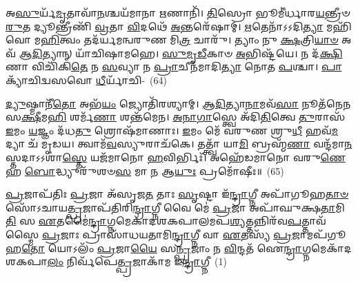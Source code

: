 𑌅\-\ul{𑌸𑍁}\-𑌰𑍍𑌯᳴\-\ul{𑌮𑍃}\-𑌤𑌾𑌵𑌾᳴\-\ul{𑌨}\-𑌶𑍍𑌚𑌯᳴𑌮𑌾𑌨𑌾 \ul{𑌋}\-𑌣𑌾𑌨𑌿᳴। \ul{𑌤𑌿}\-𑌸𑍍𑌰𑍋 𑌭𑍂𑌮𑍀॑𑌰𑍍𑌧𑌾𑌰\-\ul{𑌯}\-𑌨𑍍𑌤𑍍𑌰𑍀𑍞 \ul{𑌰𑍁}\-𑌤 𑌦𑍍𑌯𑍂𑌨𑍍𑌤𑍍𑌰𑍀𑌣𑌿᳴ \ul{𑌵𑍍𑌰}\-𑌤𑌾 \ul{𑌵𑌿}\-𑌦𑌥𑍇᳴ \ul{𑌅}\-𑌨𑍍𑌤𑌰𑍇᳴𑌷𑌾𑌮𑍍। \ul{𑌋}\-𑌤𑍇𑌨𑌾᳴𑌽𑌽𑌦𑌿\-\ul{𑌤𑍍𑌯𑌾} 𑌮𑌹𑌿᳴ 𑌵𑍋 𑌮\-\ul{𑌹𑌿}\-𑌤𑍍𑌵𑌂 𑌤𑌦᳴𑌰𑍍𑌯𑌮𑌨𑍍𑌵𑌰𑍁𑌣 𑌮𑌿\-\ul{𑌤𑍍𑌰} 𑌚𑌾𑌰𑍁᳴। 𑌤𑍍𑌯𑌾𑌂 𑌨𑍁 \ul{𑌕𑍍𑌷}\-𑌤𑍍𑌰𑌿\-\ul{𑌯𑌾}\-\-\ul{𑍞} 𑌅𑌵᳴ 𑌆\-\ul{𑌦𑌿}\-𑌤𑍍𑌯𑌾𑌨𑍍 𑌯𑌾᳴𑌚𑌿𑌷𑌾𑌮𑌹𑍇। \ul{𑌸𑍁}\-\-\ul{𑌮𑍃}\-\-\ul{𑌡𑍀}\-𑌕𑌾𑍞 \ul{𑌅}\-𑌭𑌿𑌷𑍍𑌟᳴𑌯𑍇। 𑌨 𑌦᳴\-\ul{𑌕𑍍𑌷𑌿}\-𑌣𑌾 𑌵𑌿𑌚𑌿᳴𑌕𑌿\-\ul{𑌤𑍇} 𑌨 \ul{𑌸}\-𑌵𑍍𑌯𑌾 𑌨 \ul{𑌪𑍍𑌰𑌾}\-𑌚𑍀𑌨᳴𑌮𑌾𑌦𑌿\-\ul{𑌤𑍍𑌯𑌾} 𑌨𑍋𑌤 \ul{𑌪}\-𑌶𑍍𑌚𑌾। \ul{𑌪𑌾}\-𑌕𑍍𑌯𑌾᳴𑌚𑌿𑌦𑍍𑌵𑌸𑌵𑍋 \ul{𑌧𑍀}\-𑌰𑍍𑌯𑌾᳴𑌚𑌿-~(64)

\-\ul{𑌦𑍍𑌯𑍁}\-𑌷𑍍𑌮𑌾𑌨𑍀᳴\-\ul{𑌤𑍋} 𑌅𑌭᳴\-\ul{𑌯𑌂} 𑌜𑍍𑌯𑍋𑌤𑌿᳴𑌰𑌶𑍍𑌯𑌾𑌮𑍍। \ul{𑌆}\-\-\ul{𑌦𑌿}\-𑌤𑍍𑌯𑌾\-\ul{𑌨𑌾}\-𑌮𑌵᳴\-\ul{𑌸𑌾} 𑌨𑍂𑌤᳴𑌨𑍇𑌨 𑌸\-\ul{𑌕𑍍𑌷𑍀}\-𑌮\-\ul{𑌹𑌿} 𑌶𑌰𑍍𑌮᳴\-\ul{𑌣𑌾} 𑌶𑌨𑍍𑌤᳴𑌮𑍇𑌨। \ul{𑌅}\-\-\ul{𑌨𑌾}\-\-\ul{𑌗𑌾}\-𑌸𑍍𑌤𑍍𑌵𑍇 𑌅᳴𑌦𑌿\-\ul{𑌤𑌿}\-𑌤𑍍𑌵𑍇 \ul{𑌤𑍁}\-𑌰𑌾𑌸᳴ \ul{𑌇}\-𑌮𑌂 \ul{𑌯}\-𑌜𑍍𑌞𑌂 𑌦᳴𑌧\-\ul{𑌤𑍁} 𑌶𑍍𑌰𑍋𑌷᳴𑌮𑌾𑌣𑌾𑌃। \ul{𑌇}\-𑌮𑌂 𑌮𑍇᳴ 𑌵𑌰𑍁𑌣 𑌶𑍍𑌰𑍁\-\ul{𑌧𑍀} 𑌹𑌵᳴\-\ul{𑌮}\-𑌦𑍍𑌯𑌾 𑌚᳴ 𑌮𑍃𑌡𑌯। 𑌤𑍍𑌵𑌾𑌮᳴\-\ul{𑌵}\-𑌸𑍍𑌯𑍁𑌰𑌾𑌚᳴𑌕𑍇। 𑌤𑌤𑍍𑌤𑍍𑌵𑌾᳴ 𑌯𑌾\-\ul{𑌮𑌿} 𑌬𑍍𑌰𑌹𑍍𑌮᳴\-\ul{𑌣𑌾} 𑌵𑌨𑍍𑌦᳴𑌮𑌾\-\ul{𑌨}\-𑌸𑍍𑌤𑌦𑌾𑌽𑌽𑌶𑌾॑\-\ul{𑌸𑍍𑌤𑍇} 𑌯𑌜᳴𑌮𑌾𑌨𑍋 \ul{𑌹}\-𑌵𑌿𑌰𑍍𑌭𑌿𑌃᳴। 𑌅𑌹𑍇᳴𑌡𑌮𑌾𑌨𑍋 𑌵𑌰𑍁\-\ul{𑌣𑍇}\-𑌹 \ul{𑌬𑍋}\-𑌦𑍍𑌧𑍍𑌯𑍁𑌰𑍁᳴𑌶𑍞\-\ul{𑌸} 𑌮𑌾 \ul{𑌨} 𑌆\-\ul{𑌯𑍁𑌃} 𑌪𑍍𑌰𑌮𑍋᳴𑌷𑍀𑌃॥~(65)


{\anuvakamend[{𑌨𑌾\-\ul{𑌮𑌾}\-𑌗𑍍𑌨𑌿𑌃 𑌸𑍞 𑌶𑌵᳴\-\ul{𑌸𑍋} 𑌰𑌕𑍍𑌷᳴𑌮𑌾𑌣𑌾 \ul{𑌧𑍀}\-𑌰𑍍𑌯𑌾᳴\-\ul{𑌚𑌿}\-𑌦𑍇\-\ul{𑌕𑌾}\-𑌨𑍍𑌨𑌪᳴\-\ul{𑌞𑍍𑌚𑌾}\-𑌶𑌚𑍍𑌚᳴}]}%

{}


\setcounter{anuvakam}{0}
\-\ul{𑌪𑍍𑌰}\-𑌜𑌾𑌪᳴𑌤𑌿𑌃 \ul{𑌪𑍍𑌰}\-𑌜𑌾 𑌅᳴𑌸𑍃𑌜\-\ul{𑌤} 𑌤𑌾𑌃 \ul{𑌸𑍃}\-𑌷𑍍𑌟𑌾 𑌇᳴\-\ul{𑌨𑍍𑌦𑍍𑌰𑌾}\-𑌗𑍍𑌨𑍀 𑌅𑌪𑌾᳴𑌗𑍂𑌹\-\ul{𑌤𑌾}\-\-\ul{𑍞} 𑌸𑍋᳴\-𑌽𑌚𑌾𑌯\-\ul{𑌤𑍍𑌪𑍍𑌰}\-𑌜𑌾𑌪᳴𑌤𑌿𑌰𑌿\-\ul{𑌨𑍍𑌦𑍍𑌰𑌾}\-𑌗𑍍𑌨𑍀 𑌵𑍈 𑌮𑍇॑ \ul{𑌪𑍍𑌰}\-𑌜𑌾 𑌅𑌪𑌾᳴𑌘𑍁𑌕𑍍𑌷\-\ul{𑌤𑌾}\-𑌮𑌿\-\ul{𑌤𑌿} 𑌸 \ul{𑌏}\-𑌤𑌮𑍈॑\-\ul{𑌨𑍍𑌦𑍍𑌰𑌾}\-𑌗𑍍𑌨𑌮𑍇𑌕𑌾᳴\-𑌦𑌶\-𑌕𑌪𑌾𑌲𑌮𑌪\-\ul{𑌶𑍍𑌯}\-𑌤𑍍𑌤𑌨𑍍𑌨𑌿𑌰᳴𑌵\-\ul{𑌪}\-𑌤𑍍𑌤𑌾𑌵᳴𑌸𑍍𑌮𑍈 \ul{𑌪𑍍𑌰}\-𑌜𑌾𑌃 𑌪𑍍𑌰𑌾𑌸𑌾᳴𑌧𑌯𑌤𑌾𑌮𑌿\-\ul{𑌨𑍍𑌦𑍍𑌰𑌾}\-𑌗𑍍𑌨𑍀 𑌵𑌾 \ul{𑌏}\-𑌤𑌸𑍍𑌯᳴ \ul{𑌪𑍍𑌰}\-𑌜𑌾𑌮𑌪᳴𑌗𑍂𑌹\-\ul{𑌤𑍋} 𑌯𑍋\-𑌽𑌲𑌂᳴ \ul{𑌪𑍍𑌰}\-𑌜𑌾\-\ul{𑌯𑍈} 𑌸\-\ul{𑌨𑍍𑌪𑍍𑌰}\-𑌜𑌾𑌂 𑌨 \ul{𑌵𑌿}\-𑌨𑍍𑌦𑌤᳴ 𑌐\-\ul{𑌨𑍍𑌦𑍍𑌰𑌾}\-𑌗𑍍𑌨𑌮𑍇𑌕𑌾᳴\-𑌦𑌶\-𑌕𑌪𑌾\-\ul{𑌲𑌂} 𑌨𑌿𑌰𑍍𑌵᳴𑌪𑍇\-\ul{𑌤𑍍𑌪𑍍𑌰}\-𑌜𑌾𑌕𑌾᳴𑌮 𑌇\-\ul{𑌨𑍍𑌦𑍍𑌰𑌾}\-𑌗𑍍𑌨𑍀~(1)


